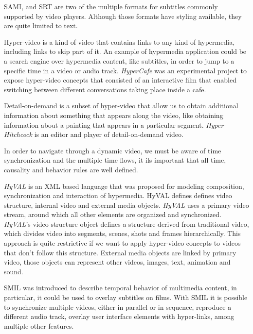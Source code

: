   \ac{SAMI}, and \ac{SRT} are two of the multiple formats for subtitles commonly supported by video players. Although those formats have styling available, they are quite limited to text. 

  Hyper-video is a kind of video that contains links to any kind of hypermedia, including links to skip part of it. An example of hypermedia application could be a search engine over hypermedia content, like subtitles, in order to jump to a specific time in a video or audio track. \emph{HyperCafe} \cite{hypercafe} was an experimental project to expose hyper-video concepts that consisted of an interactive film that enabled switching between different conversations taking place inside a cafe.
 
  Detail-on-demand is a subset of hyper-video that allow us to obtain additional information about something that appears along the video, like obtaining information about a painting that appears in a particular segment. \emph{Hyper-Hitchcock}\cite{hitchcock} is an editor and player of detail-on-demand video.

  In order to navigate through a dynamic video, we must be aware of time synchronization and the multiple time flows, it ils important that all time, causality and behavior rules are well defined.
  
  \emph{HyVAL}\cite{hyval} is an \ac{XML} based language that was proposed for modeling composition, synchronization and interaction of hypermedia. HyVAL defines defines video structure, internal video and external media objects. 
  \emph{HyVAL} uses a primary video stream, around which all other elements are organized and synchronized.
  \emph{HyVAL}'s video structure object defines a structure derived from traditional video, which divides video into segments, scenes, shots and frames hierarchically. 
  This approach is quite restrictive if we want to apply hyper-video concepts to videos that don't follow this structure. External media objects are linked by primary video, those objects can represent other videos, images, text, animation and sound.

  \ac{SMIL}\cite{smil} was introduced to describe temporal behavior of multimedia content, in particular, it could be used to overlay subtitles on films. With \ac{SMIL} it is possible to synchronize multiple videos, either in parallel or in sequence, reproduce a different audio track, overlay user interface elements with hyper-links, among multiple other features.

